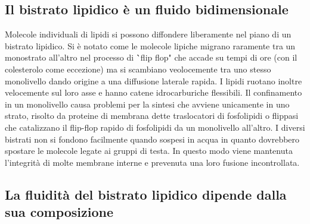 \subsection{Il bistrato lipidico \`e un fluido bidimensionale}
Molecole individuali di lipidi si possono diffondere liberamente nel piano di un bistrato lipidico. Si \`e notato come le molecole lipiche migrano 
raramente tra un monostrato all'altro nel processo di \``flip flop" che accade su tempi di ore (con il colesterolo come eccezione) ma si scambiano
veolocemente tra uno stesso monolivello dando origine a una diffusione laterale rapida. I lipidi ruotano inoltre velocemente sul loro asse e hanno 
catene idrocarburiche flessibili. Il confinamento in un monolivello causa problemi per la sintesi che avviene unicamente in uno strato, risolto da
proteine di membrana dette traslocatori di fosfolipidi o flippasi che catalizzano il flip-flop rapido di fosfolipidi da un monolivello all'altro. I 
diversi bistrati non si fondono facilmente quando sospesi in acqua in quanto dovrebbero spostare le molecole legate ai gruppi di testa. In questo modo
viene mantenuta l'integrit\`a di molte membrane interne e prevenuta una loro fusione incontrollata. 
\subsection{La fluidit\`a del bistrato lipidico dipende dalla sua composizione}
